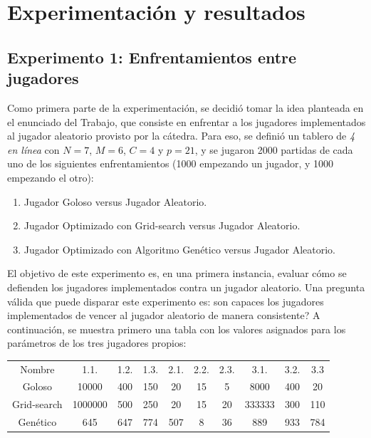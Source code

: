 \documentclass[12pt,a4paper]{article}
\begin{document}
\newpage

		
	
\section{Experimentación y resultados}


    \subsection{Experimento 1: Enfrentamientos entre jugadores}
    
    Como primera parte de la experimentación, se decidió tomar la idea planteada en el enunciado del Trabajo, que consiste en enfrentar a los jugadores implementados al jugador aleatorio provisto por la cátedra. Para eso, se definió un tablero de \textit{4 en línea} con $N=7$, $M=6$, $C=4$ y $p=21$, y se jugaron 2000 partidas de cada uno de los siguientes enfrentamientos (1000 empezando un jugador, y 1000 empezando el otro):
        \begin{enumerate}
            \item Jugador Goloso versus Jugador Aleatorio.
            \item Jugador Optimizado con Grid-search versus Jugador Aleatorio.
            \item Jugador Optimizado con Algoritmo Genético versus Jugador Aleatorio.
        \end{enumerate}
    
    El objetivo de este experimento es, en una primera instancia, evaluar cómo se defienden los jugadores implementados contra un jugador aleatorio. Una pregunta válida que puede disparar este experimento es: \textquestiondown son capaces los jugadores implementados de vencer al jugador aleatorio de manera consistente? A continuación, se muestra primero una tabla con los valores asignados para los parámetros de los tres jugadores propios:
    
    \begin{center}
		\begin{tabular}{ | c || c | c | c | c | c | c | c | c | c | }
		\hline
		Nombre &  1.1. &  1.2. &  1.3. &  2.1. &  2.2. &  2.3. &  3.1. &  3.2. &  3.3 \\ \hhline{|=#=|=|=|=|=|=|=|=|=|}
            Goloso &  10000 &  400 &  150 &  20 &  15 &  5 &  8000 &  400 &  20 \\ \hline
		    Grid-search &  1000000 &  500 &  250 &  20 &  15 &  20 &  333333 &  300 &  110 \\ \hline
		    Genético &  645 &  647 &  774 &  507 &  8 &  36 &  889 &  933 &  784 \\ \hline
		\end{tabular}
    \end{center}
    
\end{document}

